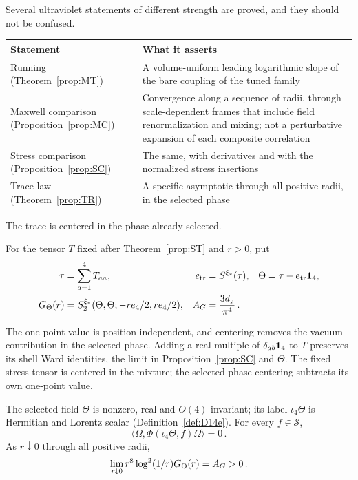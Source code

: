 Several ultraviolet statements of different strength are proved, and they should not be confused.
\begin{center}\small
\begin{tabular}{@{}p{}p{}@{}}
\toprule
Statement & What it asserts\\
\midrule
Running (Theorem~\ref{prop:MT}) & A volume-uniform leading logarithmic slope of the bare coupling of the tuned family\\
Maxwell comparison (Proposition~\ref{prop:MC}) & Convergence along a sequence of radii, through scale-dependent frames that include field renormalization and mixing; not a perturbative expansion of each composite correlation\\
Stress comparison (Proposition~\ref{prop:SC}) & The same, with derivatives and with the normalized stress insertions\\
Trace law (Theorem~\ref{prop:TR}) & A specific asymptotic through all positive radii, in the selected phase\\
\bottomrule
\end{tabular}
\end{center}
The trace is centered in the phase already selected.

\begin{definition}\label{def:D16}
For the tensor $T$ fixed after Theorem~\ref{prop:ST} and $r>0$, put
\begin{align*}
\tau&=\sum_{a=1}^4T_{aa},&e_{\rm tr}&=S^{\xi_*}(\tau),&\Theta&=\tau-e_{\rm tr}\mathbf{1}_{4},\\
G_{\Theta}(r)&=S_2^{\xi_*}(\Theta,\Theta;-re_4/2,re_4/2),&A_G&=\frac{3d_{\mathfrak{g}}}{\pi^4}\,.
\end{align*}
\end{definition}

The one-point value is position independent, and centering removes the vacuum contribution in the selected phase. Adding a real multiple of $\delta_{ab}\mathbf{1}_{4}$ to $T$ preserves its shell Ward identities, the limit in Proposition~\ref{prop:SC} and $\Theta$. The fixed stress tensor is centered in the mixture; the selected-phase centering subtracts its own one-point value.

\begin{theorem}\label{prop:TR}
The selected field $\Theta$ is nonzero, real and $O(4)$ invariant; its label $\iota_4\Theta$ is Hermitian and Lorentz scalar (Definition~\ref{def:D14e}). For every $f\in\mathcal S$,
\begin{equation*}
\langle\Omega,\Phi(\iota_4\Theta,f)\Omega\rangle=0\,.
\end{equation*}
As $r\downarrow0$ through all positive radii,
\begin{equation*}
\lim_{r\downarrow0}r^8\log^2(1/r)G_{\Theta}(r)=A_G>0\,.
\end{equation*}
\end{theorem}

